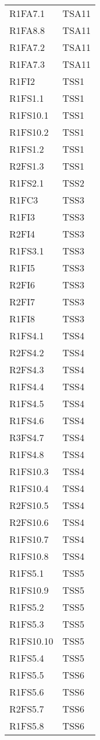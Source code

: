 {\begin{longtable}{C{4cm} C{4cm}}
R1FA7.1 & TSA11  \\
R1FA8.8 & TSA11  \\
R1FA7.2 & TSA11  \\
R1FA7.3 & TSA11  \\


R1FI2 & TSS1\\
R1FS1.1 & TSS1 \\
R1FS10.1 & TSS1 \\
R1FS10.2 & TSS1 \\
R1FS1.2 & TSS1 \\
R2FS1.3 & TSS1 \\
R1FS2.1 & TSS2 \\
R1FC3 & TSS3 \\
R1FI3 & TSS3 \\
R2FI4 & TSS3 \\
R1FS3.1 & TSS3 \\
R1FI5 & TSS3 \\
R2FI6 & TSS3 \\
R2FI7 & TSS3 \\
R1FI8 & TSS3 \\
R1FS4.1 & TSS4 \\
R2FS4.2 & TSS4 \\
R2FS4.3 & TSS4 \\
R1FS4.4 & TSS4 \\
R1FS4.5 & TSS4 \\
R1FS4.6 & TSS4 \\
R3FS4.7 & TSS4 \\
R1FS4.8 & TSS4 \\
R1FS10.3 & TSS4 \\
R1FS10.4 & TSS4 \\
R2FS10.5 & TSS4 \\
R2FS10.6 & TSS4 \\
R1FS10.7 & TSS4 \\
R1FS10.8 & TSS4 \\
R1FS5.1 & TSS5 \\
R1FS10.9 & TSS5 \\
R1FS5.2 & TSS5 \\
R1FS5.3 & TSS5 \\
R1FS10.10 & TSS5 \\
R1FS5.4 & TSS5 \\
R1FS5.5 & TSS6 \\
R1FS5.6 & TSS6 \\
R2FS5.7 & TSS6 \\
R1FS5.8 & TSS6 \\

\end{longtable}}
